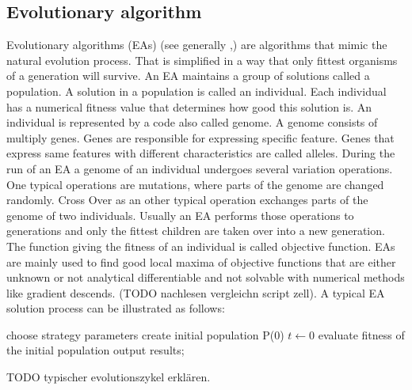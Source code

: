 \subsection{Evolutionary algorithm} %
Evolutionary algorithms (EAs) (see generally \cite{book:IntroductionEA},\cite{book:IntroductionEA}) are algorithms that mimic the natural evolution process. That is simplified in a way that only fittest organisms of a generation will survive. An EA maintains a group of solutions called a population. A solution in a population is called an individual. Each individual has a numerical fitness value that determines how good this solution is. An individual is represented by a code also called genome. A genome consists of multiply genes. Genes are responsible for expressing specific feature. Genes that express same features with different characteristics are called alleles. During the run of an EA a genome of an individual undergoes several variation operations. One typical operations are mutations, where parts of the genome are changed randomly. Cross Over as an other typical operation exchanges parts of the genome of two individuals. Usually an EA performs those operations to generations and only the fittest children are taken over into a new generation. The function giving the fitness of an individual is called objective function. EAs are mainly used to find good local maxima of objective functions that are either unknown or not analytical differentiable and not solvable with numerical methods like gradient descends.  (TODO nachlesen vergleichn script zell). A  typical EA solution process can be illustrated as follows:
\begin{algorithm}[h!] %
	choose strategy parameters\;
	create initial population P(0)\;
	$t \gets 0$\;
	evaluate fitness of the initial population\;
 	output results;
 	
\end{algorithm}
TODO typischer evolutionszykel erklären.


